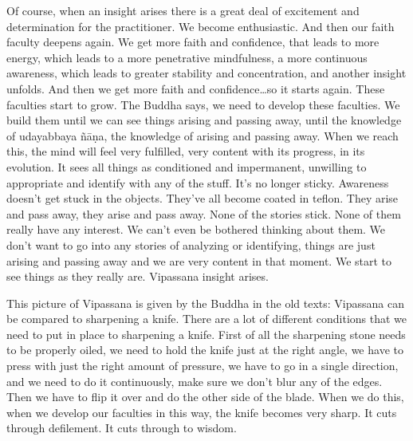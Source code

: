 \documentclass[letterpaper,10pt,english]{sphinxmanual}
\begin{document}
\sphinxAtStartPar
Of course, when an insight arises there is a great deal of excitement
and  determination  for  the  practitioner.  We  become  enthusiastic. And  then
our faith faculty deepens again. We get more faith and confidence, that leads
to more energy, which leads to a more penetrative mindfulness, a more continuous  awareness,  which  leads  to  greater  stability  and  concentration,  and
another insight unfolds. And then we get more faith and confidence…so it
starts  again.  These  faculties  start  to  grow.  The  Buddha  says,  we  need  to
develop these faculties. We build them until we can see things arising and
passing away, until the knowledge of udayabbaya ñāṇa, the knowledge of
arising and passing away. When we reach this, the mind will feel very fulfilled,  very  content  with  its  progress,  in  its  evolution.  It  sees  all  things  as
conditioned  and  impermanent,  unwilling  to  appropriate  and  identify  with
any  of  the  stuff.  It’s  no  longer  sticky. Awareness  doesn’t  get  stuck  in  the
objects. They’ve all become coated in teflon. They arise and pass away, they
  arise and pass away. None of the stories stick. None of them really have any
interest. We can’t even be bothered thinking about them. We don’t want to
go  into  any  stories  of  analyzing  or  identifying,  things  are  just  arising  and
passing away and we are very content in that moment. We start to see things
as they really are. Vipassana insight arises.

\sphinxAtStartPar
This  picture  of  Vipassana  is  given  by  the  Buddha  in  the  old  texts:
Vipassana can be compared to sharpening a knife. There are a lot of different conditions that we need to put in place to sharpening a knife. First of all
the sharpening stone needs to be properly oiled, we need to hold the knife
just at the right angle, we have to press with just the right amount of pressure, we have to go in a single direction, and we need to do it continuously,
make sure we don’t blur any of the edges. Then we have to flip it over and do
the other side of the blade. When we do this, when we develop our faculties
in this way, the knife becomes very sharp. It cuts through defilement. It cuts
through to wisdom.
\end{document}
